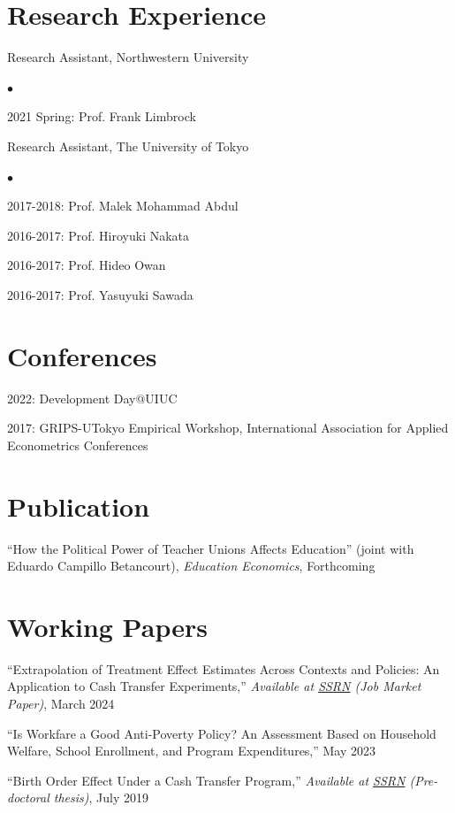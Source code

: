 \documentclass[margin,line]{res}
\newenvironment{list1}{
  \begin{list}{\ding{113}}{%
      \setlength{\itemsep}{.025in}
      \setlength{\parsep}{0in} \setlength{\parskip}{0in}
      \setlength{\topsep}{0in} \setlength{\partopsep}{0in}
      \setlength{\leftmargin}{0.17in}}}{\end{list}}
\newenvironment{list2}{
  \begin{list}{$\bullet$}{%
      \setlength{\itemsep}{0in}
      \setlength{\parsep}{0in} \setlength{\parskip}{0in}
      \setlength{\topsep}{0in} \setlength{\partopsep}{0in}
      \setlength{\leftmargin}{0.2in}}}{\end{list}}
\begin{document}
\begin{resume}
\section{Research Experience}
\begin{list1}
\item[] Research Assistant, Northwestern University
	\begin{list2}
		\item[] 2021 Spring: Prof. Frank Limbrock
	\end{list2}
\item[] Research Assistant, The University of Tokyo
	\begin{list2}
	        \item[] 2017-2018: Prof. Malek Mohammad Abdul
		\item[] 2016-2017: Prof. Hiroyuki Nakata
		\item[] 2016-2017: Prof. Hideo Owan
		\item[] 2016-2017: Prof. Yasuyuki Sawada
	\end{list2}
\end{list1}

\section{Conferences}
\begin{list1}
\item[] 2022: Development Day@UIUC
\item[] 2017: GRIPS-UTokyo Empirical Workshop, International Association for Applied Econometrics Conferences
\end{list1}

\pagebreak

\section{Publication}
\begin{list1}
\item[] ``How the Political Power of Teacher Unions Affects Education'' (joint with Eduardo Campillo Betancourt), {\it Education Economics}, Forthcoming
\end{list1}


\section{Working Papers}
\begin{list1}
\item[] ``Extrapolation of Treatment Effect Estimates Across Contexts and Policies: An Application to Cash Transfer Experiments,'' {\it Available at \href{https://papers.ssrn.com/sol3/papers.cfm?abstract_id=4863355}{SSRN} (Job Market Paper)}, March 2024
\item[] ``Is Workfare a Good Anti-Poverty Policy? An Assessment Based on Household Welfare, School Enrollment, and Program Expenditures,'' May 2023
\item[] ``Birth Order Effect Under a Cash Transfer Program,'' {\it Available at \href{https://papers.ssrn.com/sol3/papers.cfm?abstract_id=3010113}{SSRN} (Pre-doctoral thesis)}, July 2019
\end{list1}


\end{resume}
\end{document}
